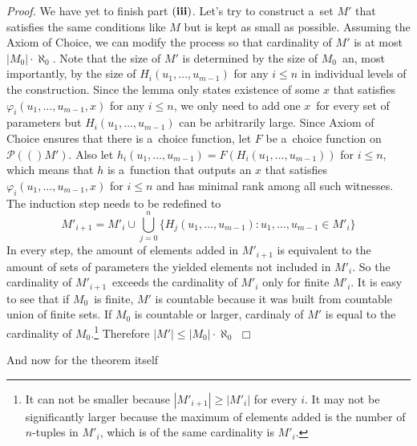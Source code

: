 \documentclass[12pt,a4paper]{article}
\newenvironment{proof}
{\noindent \textit{Proof.}}
{\hspace*{\fill} $\Box$}
\newcommand{\power}[1]{\ensuremath{\mathscr{P}} (#1)}
\begin{document}
\begin{proof}
We have yet to finish part $\bold{(iii)}$.
Let's try to construct a~set $M'$ that satisfies the same conditions like $M$ but is kept as small as possible. Assuming the Axiom of Choice, we can modify the process so that cardinality of $M'$ is at most $|M_0| \cdot \aleph_0$. Note that the size of $M'$ is determined by the size of $M_0$ an, most importantly, by the size of $H_i(u_1, \ldots, u_{m-1})$ for any $i \leq n$ in individual levels of the construction. Since the lemma only states existence of some $x$ that satisfies $\varphi_i(u_1, \ldots, u_{m-1}, x)$ for any $i \leq n$, we only need to add one $x$ for every set of parameters but $H_i(u_1, \dots, u_{m-1})$ can be arbitrarily large. Since Axiom of Choice ensures that there is a~choice function, let $F$ be a~choice function on $\power(M')$. Also let $h_i(u_1, \ldots, u_{m-1}) = F(H_i(u_1, \ldots, u_{m-1}))$ for $i \leq n$, which means that $h$ is a~function that outputs an $x$ that satisfies $\varphi_i(u_1, \ldots, u_{m-1}, x)$ for $i \leq n$ and has minimal rank among all such witnesses. The induction step needs to be redefined to
\begin{equation}
M'_{i+1} = M'_i \cup \bigcup_{j=0}^n \{ H_j(u_1, \ldots, u_{m-1}): u_1, \ldots, u_{m-1} \in M'_i \}
\end{equation}
In every step, the amount of elements added in $M'_{i+1}$ is equivalent to the amount of sets of parameters the yielded elements not included in $M'_i$. So the cardinality of $M'_{i+1}$ exceeds the cardinality of $M'_i$ only for finite $M'_i$. It is easy to see that if $M_0$ is finite, $M'$ is countable because it was built from countable union of finite sets. If $M_0$ is countable or larger, cardinaly of $M'$ is equal to the cardinality of $M_0$.\footnote{It can not be smaller because $|M'_{i+1}|  \geq |M'_i|$ for every $i$. It may not be significantly larger because the maximum of elements added is the number of $n$-tuples in $M'_i$, which is of the same cardinality is $M'_i$.}
Therefore $|M'| \leq |M_0| \cdot \aleph_0$
\end{proof}

And now for the theorem itself
\end{document}
